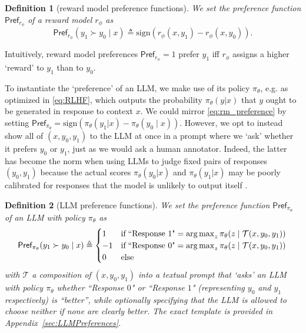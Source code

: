 \documentclass{article}
\newtheorem{definition}{Definition}
\newcommand{\pref}{\textsf{Pref}}
\DeclareMathOperator*{\argmax}{arg\,max}
\begin{document}
\begin{definition}[reward model preference functions] We set the preference function $\pref_{r_\phi}$ of a reward model ${r_\phi}$ as 
\begin{equation}\label{eq:rm_preference}
\pref_{r_\phi}(y_1 \succ y_0 \mid x) \triangleq \text{sign}(r_\phi(x, y_1) - r_\phi(x, y_0)).
\end{equation}
\end{definition}
Intuitively, reward model preferences $\pref_{r_\phi} = 1$ prefer $y_1$ iff $r_\phi$ assigns a higher `reward' to $y_1$ than to $y_0$.

To instantiate the `preference' of an LLM, we make use of its policy $\pi_\theta$, e.g. as optimized in \eqref{eq:RLHF}, which outputs the probability $\pi_\theta(y | x)$ that $y$ ought to be generated in response to context $x$. We could mirror \eqref{eq:rm_preference} by setting $\pref_{\pi_\theta} = \text{sign}(\pi_\theta(y_1| x) - \pi_\theta(y_0 \mid x))$. However, we opt to instead show all of $(x, y_0, y_1)$ to the LLM at once in a prompt where we `ask' whether it prefers $y_0$ or $y_1$, just as we would ask a human annotator. Indeed, the latter has become the norm when using LLMs to judge fixed pairs of responses $(y_0, y_1)$ \cite{lyu2024probabilitiesunveilingmisalignmentevaluating} because the actual scores $\pi_\theta(y_0 | x)$ and $\pi_\theta(y_1 | x)$ may be poorly calibrated for responses that the model is unlikely to output itself \cite{tian2023justaskcalibrationstrategies}. 

\begin{definition}[LLM preference functions] 
We set the preference function $\pref_{\pi_\theta}$ of an LLM with policy ${\pi_\theta}$ as
\begin{equation}\label{eq:llm_preference}
\pref_{\pi_\theta}(y_1 \succ y_0 \mid x) \triangleq \begin{cases}
    1 &\text{if\;} \text{``Response 1"} = \argmax_{z} \pi_\theta(z \mid \mathcal{T}(x, y_0, y_1))\\
    -1 &\text{if\;} \text{``Response 0"} = \argmax_{z} \pi_\theta(z \mid \mathcal{T}(x, y_0, y_1))\\
    0 &\text{else}\\
\end{cases}\\
\end{equation}
with $\mathcal{T}$ a composition of $(x, y_0, y_1)$ into a textual prompt that `asks' an LLM with policy $\pi_\theta$ whether \textit{``Response $0$"} or \textit{``Response $1$"} (representing $y_0$ and $y_1$ respectively) is ``better'', while optionally specifying that the LLM is allowed to choose neither if none are clearly better.  The exact template is provided in Appendix~\ref{sec:LLMPreferences}.
\end{definition}
\end{document}
